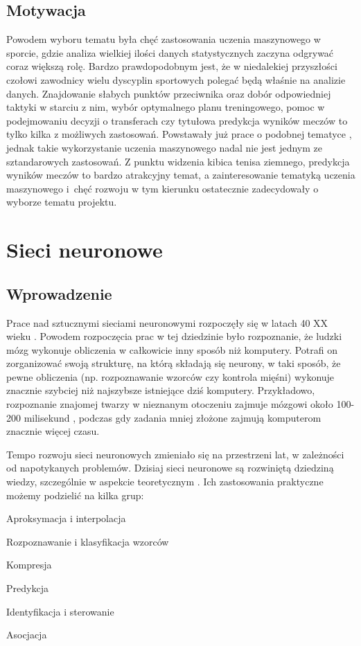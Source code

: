\section{Motywacja}
\label{Sec:Motiv}
Powodem wyboru tematu była chęć zastosowania uczenia maszynowego w sporcie, gdzie analiza wielkiej ilości danych statystycznych zaczyna odgrywać coraz większą rolę. Bardzo prawdopodobnym jest, że w niedalekiej przyszłości czołowi zawodnicy wielu dyscyplin sportowych polegać będą właśnie na analizie danych. Znajdowanie słabych punktów przeciwnika oraz dobór odpowiedniej taktyki w starciu z nim, wybór optymalnego planu treningowego, pomoc w podejmowaniu decyzji o transferach czy tytułowa predykcja wyników meczów to tylko kilka z możliwych zastosowań.  Powstawały już prace o podobnej tematyce \cite{mlten01}, jednak takie wykorzystanie uczenia maszynowego nadal nie jest jednym ze sztandarowych zastosowań. Z punktu widzenia kibica tenisa ziemnego, predykcja wyników meczów to bardzo atrakcyjny temat, a zainteresowanie tematyką uczenia maszynowego i~chęć rozwoju w tym kierunku ostatecznie zadecydowały o wyborze tematu projektu.


\chapter{Sieci neuronowe}
\section{Wprowadzenie}
\label{Sec:ThIntro}
Prace nad sztucznymi sieciami neuronowymi rozpoczęły się w latach 40 XX wieku \cite{osow01}. Powodem rozpoczęcia prac w tej dziedzinie było rozpoznanie, że ludzki mózg wykonuje obliczenia w całkowicie inny sposób niż komputery. Potrafi on zorganizować swoją strukturę, na którą składają się neurony, w taki sposób, że pewne obliczenia (np. rozpoznawanie wzorców czy kontrola mięśni) wykonuje znacznie szybciej niż najszybsze istniejące dziś komputery. Przykładowo, rozpoznanie znajomej twarzy w nieznanym otoczeniu zajmuje mózgowi około 100-200 milisekund \cite{hayk01}, podczas gdy zadania mniej złożone zajmują komputerom znacznie więcej czasu. 

Tempo rozwoju sieci neuronowych zmieniało się na przestrzeni lat, w zależności od napotykanych problemów. Dzisiaj sieci neuronowe są rozwiniętą dziedziną wiedzy, szczególnie w aspekcie teoretycznym \cite{osow01}. Ich zastosowania praktyczne możemy podzielić na kilka grup:
\begin{tightitemize}
\item Aproksymacja i interpolacja
\item Rozpoznawanie i klasyfikacja wzorców
\item Kompresja
\item Predykcja
\item Identyfikacja i sterowanie
\item Asocjacja
\end{tightitemize}

